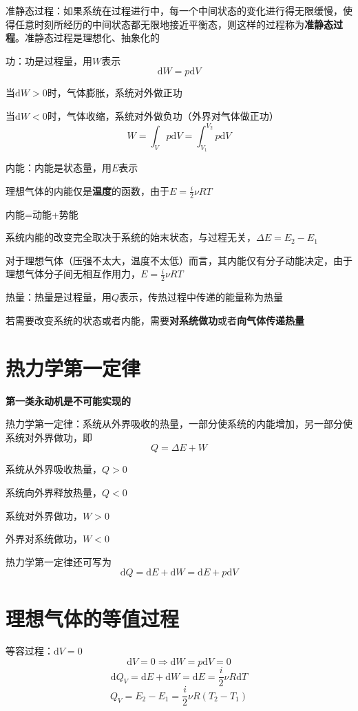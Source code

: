 \documentclass[12pt, a4paper, twoside]{ctexbook}
\begin{document}
{\sonti 准静态过程}：如果系统在过程进行中，每一个中间状态的变化进行得无限缓慢，使得任意时刻所经历的中间状态都无限地接近平衡态，则这样的过程称为\textbf{准静态过程}。准静态过程是理想化、抽象化的

{\sonti 功}：功是过程量，用$W$表示
$$
\mathrm{d}W=p\mathrm{d}V
$$

当$\mathrm{d}W>0$时，气体膨胀，系统对外做正功

当$\mathrm{d}W<0$时，气体收缩，系统对外做负功（外界对气体做正功）
$$
W=\int_V p\mathrm{d}V=\int_{V_1}^{V_2} p\mathrm{d}V
$$

{\sonti 内能}：内能是状态量，用$E$表示

理想气体的内能仅是\textbf{温度}的函数，由于$E=\frac{i}{2}\nu RT$

内能=动能+势能

系统内能的改变完全取决于系统的始末状态，与过程无关，$\Delta E=E_2-E_1$

对于理想气体（压强不太大，温度不太低）而言，其内能仅有分子动能决定，由于理想气体分子间无相互作用力，$E=\frac{i}{2}\nu RT$

{\sonti 热量}：热量是过程量，用$Q$表示，传热过程中传递的能量称为热量

若需要改变系统的状态或者内能，需要\textbf{对系统做功}或者\textbf{向气体传递热量}
\section{热力学第一定律}
\textbf{第一类永动机是不可能实现的}

{\sonti 热力学第一定律}：系统从外界吸收的热量，一部分使系统的内能增加，另一部分使系统对外界做功，即
$$
Q=\Delta E+W
$$

系统从外界吸收热量，$Q>0$

系统向外界释放热量，$Q<0$

系统对外界做功，$W>0$

外界对系统做功，$W<0$

热力学第一定律还可写为
$$
\mathrm{d}Q=\mathrm{d}E+\mathrm{d}W=\mathrm{d}E+p\mathrm{d}V
$$

\section{理想气体的等值过程}
{\sonti 等容过程}：$\mathrm{d}V=0$
$$
\mathrm{d}V=0 \Rightarrow \mathrm{d}W=p\mathrm{d}V=0
$$
$$
\mathrm{d}Q_V=\mathrm{d}E+\mathrm{d}W=\mathrm{d}E=\frac{i}{2}\nu R\mathrm{d}T
$$
$$
Q_V=E_2-E_1=\frac{i}{2}\nu R(T_2-T_1)
$$
\end{document}
